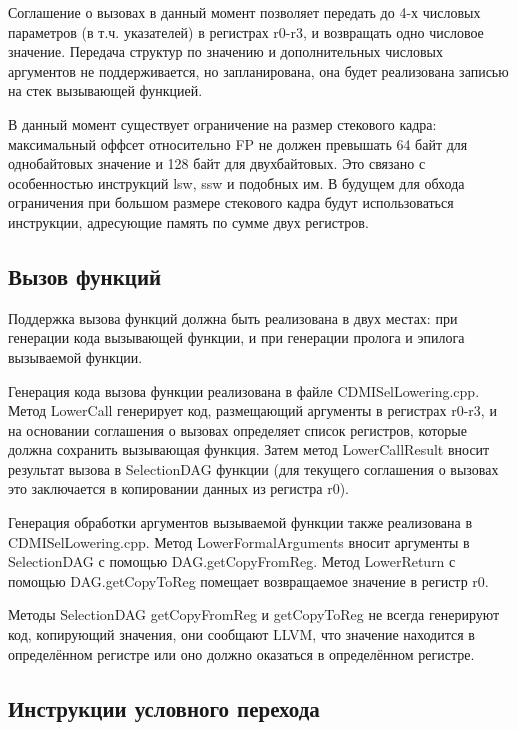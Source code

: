 \documentclass[a4paper,14pt]{extarticle}
\begin{document}
Соглашение о вызовах в данный момент позволяет передать до 4-х числовых параметров (в т.ч. указателей) в регистрах r0-r3, и возвращать одно числовое значение. Передача структур по значению и дополнительных числовых аргументов не поддерживается, но запланирована, она будет реализована записью на стек вызывающей функцией.

В данный момент существует ограничение на размер стекового кадра: максимальный оффсет относительно FP не должен превышать 64 байт для однобайтовых значение и 128 байт для двухбайтовых. Это связано с особенностью инструкций lsw, ssw и подобных им. В будущем для обхода ограничения при большом размере стекового кадра будут использоваться инструкции, адресующие память по сумме двух регистров.

\subsection{Вызов функций}

Поддержка вызова функций должна быть реализована в двух местах: при генерации кода вызывающей функции, и при генерации пролога и эпилога вызываемой функции.

Генерация кода вызова функции реализована в файле CDMISelLowering.cpp. Метод LowerCall генерирует код, размещающий аргументы в регистрах r0-r3, и на основании соглашения о вызовах определяет список регистров, которые должна сохранить вызывающая функция. Затем метод LowerCallResult вносит результат вызова в SelectionDAG функции (для текущего соглашения о вызовах это заключается в копировании данных из регистра r0).

Генерация обработки аргументов вызываемой функции также реализована в CDMISelLowering.cpp. Метод LowerFormalArguments вносит аргументы в SelectionDAG с помощью DAG.getCopyFromReg. Метод LowerReturn с помощью DAG.getCopyToReg помещает возвращаемое значение в регистр r0.

Методы SelectionDAG getCopyFromReg и getCopyToReg не всегда генерируют код, копирующий значения, они сообщают LLVM, что значение находится в определённом регистре или оно должно оказаться в определённом регистре.


\subsection{Инструкции условного перехода}
\end{document}
